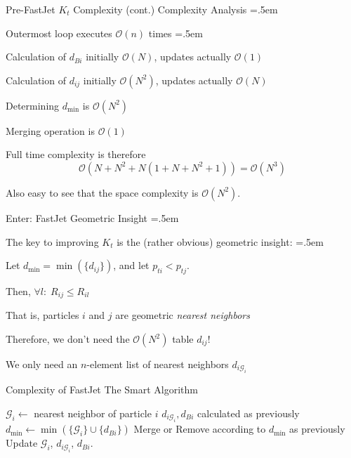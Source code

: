 \documentclass[xcolor={dvipsnames}]{beamer}
\let\olditemize=\itemize
\let\endolditemize=\enditemize
\renewenvironment{itemize}{\olditemize \itemsep=.5em }{\endolditemize}
\newcommand{\ord}[1]{\mathcal{O}(#1)}
\begin{document}
\begin{frame}{Pre-FastJet $K_t$ Complexity (cont.)}
\alert{Complexity Analysis}
\begin{itemize}
    \item<2-> Outermost loop executes $\mathcal{O}(n)$ times
    \begin{itemize}
        \item<3-> Calculation of $d_{Bi}$ initially $\ord{N}$, updates actually $\ord{1}$
        \item<4-> Calculation of $d_{ij}$ initially $\ord{N^2}$, updates actually $\ord{N}$
        \item<5-> Determining $d_\text{min}$ is $\ord{N^2}$
        \item<6-> Merging operation is $\ord{1}$
    \end{itemize}
    \item<7-> Full time complexity is therefore \[ \ord{N + N^2 + N(1 + N + N^2 + 1)} = \ord{N^3} \]
    \item<8-> Also easy to see that the space complexity is $\ord{N^2}$.
\end{itemize}
\end{frame}

\begin{frame}{Enter: FastJet}
\alert{Geometric Insight}
\begin{itemize}
    \item<2-> The key to improving $K_t$ is the (rather obvious) geometric insight:
    \begin{itemize}
        \item<3-> Let $d_\text{min} = \min(\{d_{ij}\})$, and let $p_{ti} < p_{tj}$.
        \item<4-> Then, $\forall l:\;R_{ij} \leq R_{il} \quad$
    \end{itemize}
    \item<5-> That is, particles $i$ and $j$ are geometric \textit{nearest neighbors}
    \item<6-> Therefore, we don't need the $\ord{N^2}$ table $d_{ij}$!
    \item<7-> We only need an $n$-element list of nearest neighbors $d_{i\mathcal{G}_i}$
\end{itemize}
\end{frame}

\begin{frame}{Complexity of FastJet}
\alert{The Smart Algorithm}
\begin{algorithm}[H]
    \caption{\texttt{FastJet} $K_t$}
    \begin{algorithmic}[1]
            \State $\mathcal{G}_i \gets $ nearest neighbor of particle $i$
            \State $d_{i\mathcal{G}_i}, d_{Bi}$ calculated as previously
        \EndFor
        \Repeat
            \State $d_\text{min} \gets \min(\{\mathcal{G}_i\}\cup\{d_{Bi}\})$
            \State Merge or Remove according to $d_\text{min}$ as previously
            \State Update $\mathcal{G}_i$, $d_{i\mathcal{G}_i}$, $d_{Bi}$.
    \end{algorithmic}
\end{algorithm}
\end{frame}
\end{document}

